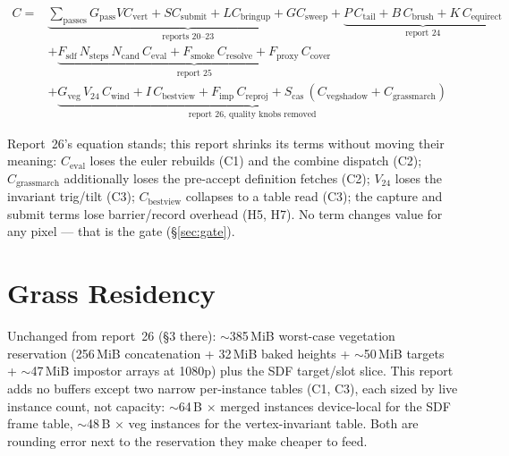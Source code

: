\documentclass[11pt,a4paper]{article}
\begin{document}
\begin{equation}
\begin{aligned}
C = &\underbrace{\sum_{\mathrm{passes}} G_{\mathrm{pass}} V C_{\mathrm{vert}} + S C_{\mathrm{submit}} + L C_{\mathrm{bringup}} + G C_{\mathrm{sweep}}}_{\text{reports 20--23}} + \underbrace{P\,C_{\mathrm{tail}} + B\,C_{\mathrm{brush}} + K\,C_{\mathrm{equirect}}}_{\text{report 24}} \\
&+ \underbrace{F_{\mathrm{sdf}}\,N_{\mathrm{steps}}\,N_{\mathrm{cand}}\,C_{\mathrm{eval}} + F_{\mathrm{smoke}}\,C_{\mathrm{resolve}} + F_{\mathrm{proxy}}\,C_{\mathrm{cover}}}_{\text{report 25}} \\
&+ \underbrace{G_{\mathrm{veg}}\,V_{24}\,C_{\mathrm{wind}} + I\,C_{\mathrm{bestview}} + F_{\mathrm{imp}}\,C_{\mathrm{reproj}} + S_{\mathrm{cas}}\,(C_{\mathrm{vegshadow}} + C_{\mathrm{grassmarch}})}_{\text{report 26, quality knobs removed}}
\end{aligned}
\end{equation}

Report~26's equation stands; this report shrinks its terms without moving
their meaning: $C_{\mathrm{eval}}$ loses the euler rebuilds (C1) and the
combine dispatch (C2); $C_{\mathrm{grassmarch}}$ additionally loses the
pre-accept definition fetches (C2); $V_{24}$ loses the invariant trig/tilt
(C3); $C_{\mathrm{bestview}}$ collapses to a table read (C3); the capture
and submit terms lose barrier/record overhead (H5, H7). No term changes
value for any pixel --- that is the gate (\S\ref{sec:gate}).

\section{Grass Residency}

Unchanged from report~26 (\S3 there): $\sim$385\,MiB worst-case
vegetation reservation (256\,MiB concatenation + 32\,MiB baked heights +
$\sim$50\,MiB targets + $\sim$47\,MiB impostor arrays at 1080p) plus the
SDF target/slot slice. This report adds no buffers except two narrow
per-instance tables (C1, C3), each sized by live instance count, not
capacity: $\sim$64\,B $\times$ merged instances device-local for the SDF
frame table, $\sim$48\,B $\times$ veg instances for the vertex-invariant
table. Both are rounding error next to the reservation they make cheaper
to feed.

\end{document}
